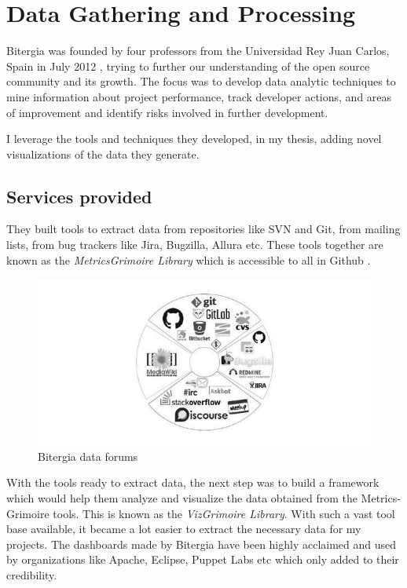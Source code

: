 \documentclass[double,12pt]{beavtex}
\begin{document}
\chapter{Data Gathering and Processing}
Bitergia was founded by four professors from the Universidad Rey Juan Carlos, Spain in July 2012 \cite{bit}, trying to further our understanding of the open source community and its growth. The focus was to develop data analytic techniques to mine information about project performance, track developer actions, and areas of improvement and identify risks involved in
further development.

I leverage the tools and techniques they developed, in my thesis, adding novel visualizations of the data they generate.

\section{Services provided}
They built tools to extract data from repositories like SVN and Git, from mailing lists, from bug trackers like Jira, Bugzilla, Allura etc. These tools together are known as the \emph{MetricsGrimoire Library} which is accessible to all in Github \cite{metrics}.

\begin{figure}[H]
\centering
\includegraphics[width=140mm]{bitergia.jpg}
\caption{Bitergia data forums}
\end{figure}

With the tools ready to extract data, the next step was to build a framework which would help them analyze and visualize the data obtained from the Metrics-Grimoire tools. This is known as the \emph{VizGrimoire Library}. With such a vast tool base available, it became a lot easier to extract the necessary data for my projects. The dashboards made by Bitergia have been highly acclaimed and used by organizations like Apache, Eclipse, Puppet Labs etc which only added to their credibility.
\end{document}
